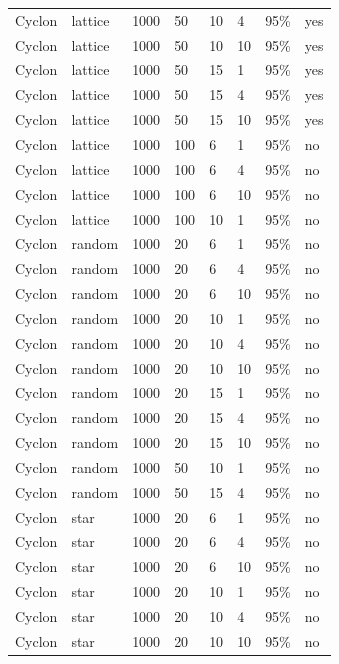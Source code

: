 \documentclass[a4paper]{ifacconf}
\begin{document}
\begin{table}
\begin{tabular}{llllllll}
        Cyclon & lattice & 1000 & 50 & 10 & 4 & 95\% & yes \\
        Cyclon & lattice & 1000 & 50 & 10 & 10 & 95\% & yes \\
        Cyclon & lattice & 1000 & 50 & 15 & 1 & 95\% & yes \\
        Cyclon & lattice & 1000 & 50 & 15 & 4 & 95\% & yes \\
        Cyclon & lattice & 1000 & 50 & 15 & 10 & 95\% & yes \\
        Cyclon & lattice & 1000 & 100 & 6 & 1 & 95\% & no \\
        Cyclon & lattice & 1000 & 100 & 6 & 4 & 95\% & no \\
        Cyclon & lattice & 1000 & 100 & 6 & 10 & 95\% & no \\
        Cyclon & lattice & 1000 & 100 & 10 & 1 & 95\% & no \\
        Cyclon & random & 1000 & 20 & 6 & 1 & 95\% & no \\
        Cyclon & random & 1000 & 20 & 6 & 4 & 95\% & no \\
        Cyclon & random & 1000 & 20 & 6 & 10 & 95\% & no \\
        Cyclon & random & 1000 & 20 & 10 & 1 & 95\% & no \\
        Cyclon & random & 1000 & 20 & 10 & 4 & 95\% & no \\
        Cyclon & random & 1000 & 20 & 10 & 10 & 95\% & no \\
        Cyclon & random & 1000 & 20 & 15 & 1 & 95\% & no \\
        Cyclon & random & 1000 & 20 & 15 & 4 & 95\% & no \\
        Cyclon & random & 1000 & 20 & 15 & 10 & 95\% & no \\
        Cyclon & random & 1000 & 50 & 10 & 1 & 95\% & no \\
        Cyclon & random & 1000 & 50 & 15 & 4 & 95\% & no \\
        Cyclon & star & 1000 & 20 & 6 & 1 & 95\% & no \\
        Cyclon & star & 1000 & 20 & 6 & 4 & 95\% & no \\
        Cyclon & star & 1000 & 20 & 6 & 10 & 95\% & no \\
        Cyclon & star & 1000 & 20 & 10 & 1 & 95\% & no \\
        Cyclon & star & 1000 & 20 & 10 & 4 & 95\% & no \\
        Cyclon & star & 1000 & 20 & 10 & 10 & 95\% & no \\

\end{tabular}
\end{table}
\end{document}
